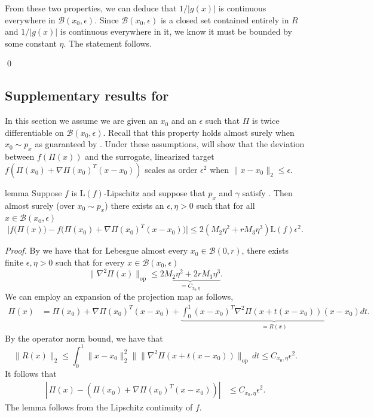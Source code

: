 \documentclass[11pt]{article}
\begin{document}
From these two properties, we can deduce that $1/|g(x)|$ is continuous everywhere in $\mathcal{B}(x_0,\epsilon)$. Since $\mathcal{B}(x_0,\epsilon)$ is a closed set contained entirely in $R$ and $1/|g(x)|$ is continuous everywhere in it, we know it must be bounded by some constant $\eta$. The statement follows.

\qed{}


\subsection{Supplementary results for }

In this section we assume we are given an $x_0$ and an $\epsilon$ such that $\Pi$ is twice differentiable on $\mathcal{B}(x_0, \epsilon)$. Recall that this property holds almost surely when $x_0 \sim p_x$ as guaranteed by . Under these assumptions,  will show that the deviation between $f(\Pi(x))$ and the surrogate, linearized target $f(\Pi(x_0) +\nabla\Pi(x_0)^T(x-x_0))$ scales as order $\epsilon^2$ when $\|x - x_0\|_2 \leq \epsilon$. 

\begin{restatable}[Approximation]{lemma}{} \label{lemma: proj approx}
    Suppose $f$ is $\text{L}(f)$-Lipschitz and suppose that $p_x$ and $\gamma$ satisfy . Then almost surely (over $x_0 \sim p_x$) there exists an $\epsilon, \eta > 0$ such that for all $x \in \mathcal{B}(x_0, \epsilon)$ 
    \[\bigg|f\big(\Pi(x)\big) - f\big(\Pi(x_0) + \nabla\Pi(x_0)^{T}(x-x_0) \big)\bigg| \le 2(M_2\eta^2+rM_3\eta^3)\text{L}(f)\epsilon^2. \]
\end{restatable}

\noindent \textit{Proof.} By  we have that for Lebesgue almost every $x_0 \in \mathcal{B}(0,r)$, there exists finite $\epsilon, \eta > 0$ such that for every $x \in \mathcal{B}(x_0, \epsilon)$
\[\|\nabla^2\Pi(x)\|_{\text{op}} \leq \underbrace{2M_2\eta^{2}+2rM_3\eta^3}_{= C_{x_0, \eta}}.\]
We can employ an expansion of the projection map as follows,
\begin{align*}
    \Pi(x) &= \Pi(x_0) + \nabla\Pi(x_0)^{T}(x-x_0) + \underbrace{\int_{0}^{1}(x-x_0)^T\nabla^2\Pi(x+t(x-x_0))(x-x_0) dt}_{= R(x)}.
\end{align*}
By the operator norm bound, we have that
\[\|R(x)\|_2 \leq \int_{0}^{1}\|x - x_0\|_2^2\|\|\nabla^2\Pi(x+t(x-x_0))\|_{\text{op}} \,dt \leq C_{x_0, \eta}\epsilon^2.\]
It follows that 
\begin{align}
    \left|\,\Pi(x) - \left(\Pi(x_0) + \nabla\Pi(x_0)^{T}(x-x_0)\right)\right| &\leq C_{x_0, \eta}\epsilon^2.
\end{align}
The lemma follows from the Lipschitz continuity of $f$. 
\end{document}
